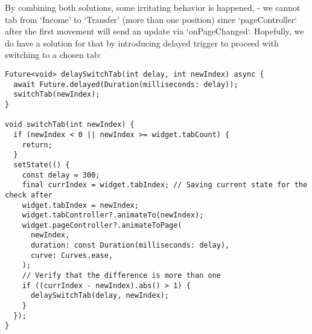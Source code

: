 By combining both solutions, some irritating behavior is happened, - we cannot tab from `Income' to `Transfer' 
(more than one position) since `pageController` after the first movement will send an update via `onPageChanged`. 
Hopefully, we do have a solution for that by introducing delayed trigger to proceed with switching to a chosen tab:

\begin{lstlisting}
Future<void> delaySwitchTab(int delay, int newIndex) async {
  await Future.delayed(Duration(milliseconds: delay));
  switchTab(newIndex);
}

void switchTab(int newIndex) {
  if (newIndex < 0 || newIndex >= widget.tabCount) {
    return;
  }
  setState(() {
    const delay = 300;
    final currIndex = widget.tabIndex; // Saving current state for the check after 
    widget.tabIndex = newIndex;
    widget.tabController?.animateTo(newIndex);
    widget.pageController?.animateToPage(
      newIndex,
      duration: const Duration(milliseconds: delay),
      curve: Curves.ease,
    );
    // Verify that the difference is more than one
    if ((currIndex - newIndex).abs() > 1) {
      delaySwitchTab(delay, newIndex);
    }
  });
}
\end{lstlisting}